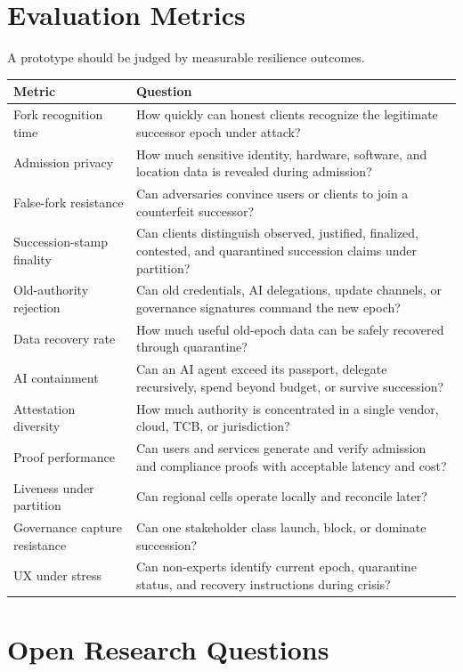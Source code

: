 \documentclass[11pt,letterpaper]{article}
\begin{document}
\section{Evaluation Metrics}

A prototype should be judged by measurable resilience outcomes.

\begin{longtable}{p{}p{}}
\toprule
\textbf{Metric} & \textbf{Question} \\
\midrule
Fork recognition time & How quickly can honest clients recognize the legitimate successor epoch under attack? \\
Admission privacy & How much sensitive identity, hardware, software, and location data is revealed during admission? \\
False-fork resistance & Can adversaries convince users or clients to join a counterfeit successor? \\
Succession-stamp finality & Can clients distinguish observed, justified, finalized, contested, and quarantined succession claims under partition? \\
Old-authority rejection & Can old credentials, AI delegations, update channels, or governance signatures command the new epoch? \\
Data recovery rate & How much useful old-epoch data can be safely recovered through quarantine? \\
AI containment & Can an AI agent exceed its passport, delegate recursively, spend beyond budget, or survive succession? \\
Attestation diversity & How much authority is concentrated in a single vendor, cloud, TCB, or jurisdiction? \\
Proof performance & Can users and services generate and verify admission and compliance proofs with acceptable latency and cost? \\
Liveness under partition & Can regional cells operate locally and reconcile later? \\
Governance capture resistance & Can one stakeholder class launch, block, or dominate succession? \\
UX under stress & Can non-experts identify current epoch, quarantine status, and recovery instructions during crisis? \\
\bottomrule
\end{longtable}

\section{Open Research Questions}
\end{document}
